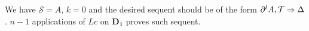 We have $\mathcal{S} = A$, $k = 0$ and the desired sequent should be of the form $\partial^l A , \mathcal{T} \Rightarrow \Delta$. $n-1$ applications of $Lc$ on $\mathbf{D_1}$ proves such sequent.
